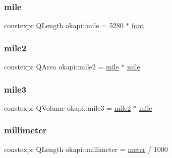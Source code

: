\mbox{\label{namespaceokapi_adb797d6d549d23e9b2e6c817a07ddfba}} 
\subsubsection{\texorpdfstring{mile}{mile}}
{\footnotesize\ttfamily constexpr Q\+Length okapi\+::mile = 5280 $\ast$ \mbox{\hyperlink{namespaceokapi_a76974d5bf7ed9473b2d59153894a8587}{foot}}}

\mbox{\label{namespaceokapi_afa03e58d2dcfa00d61968ef1c183909d}} 
\subsubsection{\texorpdfstring{mile2}{mile2}}
{\footnotesize\ttfamily constexpr Q\+Area okapi\+::mile2 = \mbox{\hyperlink{namespaceokapi_adb797d6d549d23e9b2e6c817a07ddfba}{mile}} $\ast$ \mbox{\hyperlink{namespaceokapi_adb797d6d549d23e9b2e6c817a07ddfba}{mile}}}

\mbox{\label{namespaceokapi_a01976bc3ef4067a1146756d3853cf137}} 
\subsubsection{\texorpdfstring{mile3}{mile3}}
{\footnotesize\ttfamily constexpr Q\+Volume okapi\+::mile3 = \mbox{\hyperlink{namespaceokapi_afa03e58d2dcfa00d61968ef1c183909d}{mile2}} $\ast$ \mbox{\hyperlink{namespaceokapi_adb797d6d549d23e9b2e6c817a07ddfba}{mile}}}

\mbox{\label{namespaceokapi_a9343219094a8231c1e3bc95505ba1227}} 
\subsubsection{\texorpdfstring{millimeter}{millimeter}}
{\footnotesize\ttfamily constexpr Q\+Length okapi\+::millimeter = \mbox{\hyperlink{namespaceokapi_a59563b3d4b18633f1c8d852e2932d1db}{meter}} / 1000}

\mbox{\label{namespaceokapi_a846f4e01f428ad9bff90f8dd7f7610d8}} 
